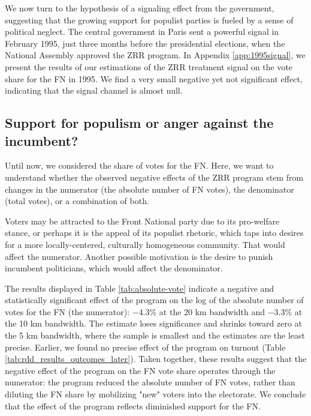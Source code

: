 We now turn to the hypothesis of a signaling effect from the government, suggesting that the growing support for populist parties is fueled by a sense of political neglect. The central government in Paris sent a powerful signal in February 1995, just three months before the presidential elections, when the National Assembly approved the ZRR program. In Appendix \ref{app:1995signal}, we present the results of our estimations of the ZRR treatment signal on the vote share for the FN in 1995. We find a very small negative yet not significant effect, indicating that the signal channel is almost null. 

\subsection{Support for populism or anger against the incumbent?}


Until now, we considered the share of votes for the FN. Here, we want to understand whether the observed negative effects of the ZRR program stem from changes in the numerator (the absolute number of FN votes), the denominator (total votes), or a combination of both.

Voters may be attracted to the Front National party due to its pro-welfare stance, or perhaps it is the appeal of its populist rhetoric, which taps into desires for a more locally-centered, culturally homogeneous community. That would affect the numerator. Another possible motivation is the desire to punish incumbent politicians, which would affect the denominator.


The results displayed in Table \ref{tab:absolute-vote} indicate a negative and statistically significant effect of the program on the log of the absolute number of votes for the FN (the numerator): $-$4.3\% at the 20 km bandwidth and $-$3.3\% at the 10 km bandwidth. The estimate loses significance and shrinks toward zero at the 5 km bandwidth, where the sample is smallest and the estimates are the least precise. Earlier, we found no precise effect of the program on turnout (Table \ref{tab:rdd_results_outcomes_later}). Taken together, these results suggest that the negative effect of the program on the FN vote share operates through the numerator: the program reduced the absolute number of FN votes, rather than diluting the FN share by mobilizing "new" voters into the electorate. We conclude that the effect of the program reflects diminished support for the FN.




